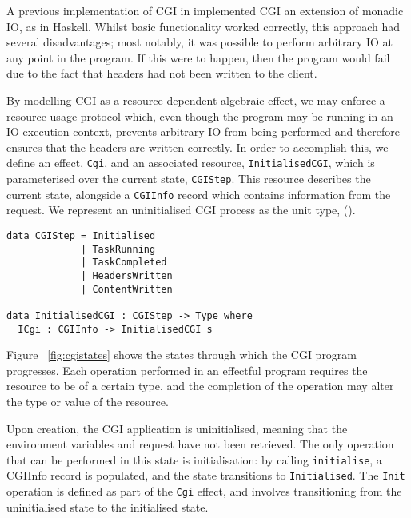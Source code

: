 \documentclass[preprint]{sigplanconf}
\begin{document}
A previous implementation of CGI in \idris{} implemented CGI an extension of monadic IO, as in Haskell. Whilst basic functionality worked correctly, this approach had several disadvantages; most notably, it was possible to perform arbitrary IO at any point in the program. If this were to happen, then the program would fail due to the fact that headers had not been written to the client.

By modelling CGI as a resource-dependent algebraic effect, we may enforce a resource usage protocol which, even though the program may be running in an IO execution context, prevents arbitrary IO from being performed and therefore ensures that the headers are written correctly. In order to accomplish this, we define an effect, \texttt{Cgi}, and an associated resource, \texttt{InitialisedCGI}, which is parameterised over the current state, \texttt{CGIStep}. This resource describes the current state, alongside a \texttt{CGIInfo} record which contains information from the request. We represent an uninitialised CGI process as the unit type, ().
{\small
\begin{verbatim}
data CGIStep = Initialised 
             | TaskRunning 
             | TaskCompleted 
             | HeadersWritten 
             | ContentWritten

data InitialisedCGI : CGIStep -> Type where
  ICgi : CGIInfo -> InitialisedCGI s
\end{verbatim}
}
Figure ~\ref{fig:cgistates} shows the states through which the CGI program progresses. Each operation performed in an effectful program requires the resource to be of a certain type, and the completion of the operation may alter the type or value of the resource.

Upon creation, the CGI application is uninitialised, meaning that the environment variables and request have not been retrieved. The only operation that can be performed in this state is initialisation: by calling \texttt{initialise}, a CGIInfo record is populated, and the state transitions to \texttt{Initialised}. The \texttt{Init} operation is defined as part of the \texttt{Cgi} effect, and involves transitioning from the uninitialised state to the initialised state.
\end{document}
